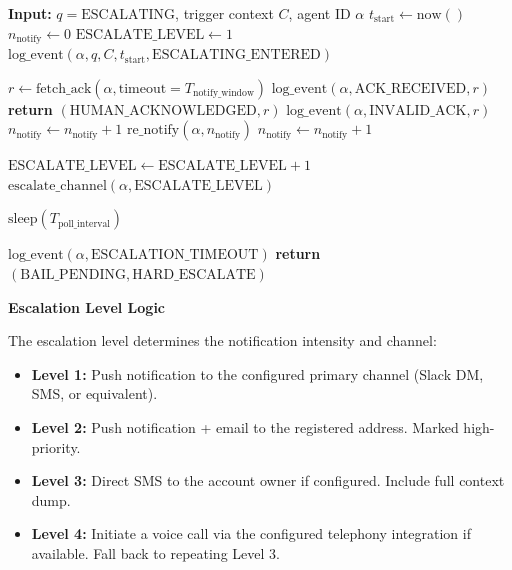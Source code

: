 \begin{algorithm}
  \caption{Bailout Escalation Algorithm}
  \label{alg:escalation}
  \begin{algorithmic}[1]
    \STATE \textbf{Input:} $q = \text{ESCALATING}$, trigger context $C$, agent ID $\alpha$
    \STATE $t_{\text{start}} \gets \text{now}()$
    \STATE $n_{\text{notify}} \gets 0$
    \STATE $\text{ESCALATE\_LEVEL} \gets 1$
    \STATE $\text{log\_event}(\alpha, q, C, t_{\text{start}}, \text{ESCALATING\_ENTERED})$

      \STATE $r \gets \text{fetch\_ack}(\alpha, \text{timeout}=T_{\text{notify\_window}})$
          \STATE $\text{log\_event}(\alpha, \text{ACK\_RECEIVED}, r)$
          \STATE \textbf{return} $(\text{HUMAN\_ACKNOWLEDGED}, r)$
        \ELSE
          \STATE $\text{log\_event}(\alpha, \text{INVALID\_ACK}, r)$
          \STATE $n_{\text{notify}} \gets n_{\text{notify}} + 1$
          \STATE $\text{re\_notify}(\alpha, n_{\text{notify}})$
        \ENDIF
      \ENDIF
      \STATE $n_{\text{notify}} \gets n_{\text{notify}} + 1$

        \STATE $\text{ESCALATE\_LEVEL} \gets \text{ESCALATE\_LEVEL} + 1$
        \STATE $\text{escalate\_channel}(\alpha, \text{ESCALATE\_LEVEL})$
      \ENDIF

      \STATE $\text{sleep}(T_{\text{poll\_interval}})$
    \ENDWHILE

    \STATE $\text{log\_event}(\alpha, \text{ESCALATION\_TIMEOUT})$
    \STATE \textbf{return} $(\text{BAIL\_PENDING}, \text{HARD\_ESCALATE})$
  \end{algorithmic}
  \end{algorithm}

\bigskip
\noindent\textbf{Escalation Level Logic}

The escalation level determines the notification intensity and channel:

\begin{itemize}
  \item \textbf{Level 1:} Push notification to the configured primary channel (Slack DM, SMS, or equivalent).
  \item \textbf{Level 2:} Push notification + email to the registered address. Marked high-priority.
  \item \textbf{Level 3:} Direct SMS to the account owner if configured. Include full context dump.
  \item \textbf{Level 4:} Initiate a voice call via the configured telephony integration if available. Fall back to repeating Level 3.
\end{itemize}

